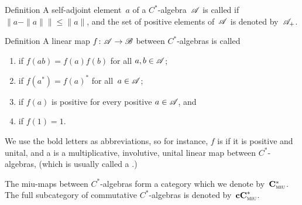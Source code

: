 \documentclass[main]{subfiles}
\begin{document}
\begin{parsec}%
\begin{point}{Definition}%
A self-adjoint element~$a$ of a $C^*$-algebra~$\mathscr{A}$ is called
 if $\|a-\|a\|\|\leq \|a\|$,
and the set of positive elements of~$\mathscr{A}$
is denoted by~$\mathscr{A}_{+}$.
\end{point}
\end{parsec}

\begin{parsec}%
\begin{point}{Definition}
A linear map $f\colon \mathscr{A} \to \mathscr{B}$
between $C^*$-algebras
is called
\begin{enumerate}
\item
{}
if $f(ab)=f(a)f(b)$ for all $a,b\in\mathscr{A}$;
\item
{}
if $f(a^*)=f(a)^*$ for all~$a\in\mathscr{A}$;
\item
{}
if $f(a)$ is positive
for every positive $a\in\mathscr{A}$, and
\item
{}
if $f(1)=1$.
\end{enumerate}
\begin{point}%
We use the bold letters as abbreviations,
so for instance,
$f$ is  if it is positive and unital,
and a 
is a multiplicative, involutive, unital linear map between $C^*$-algebras,
(which is usually called a .)
\end{point}
\begin{point}%
The miu-maps between $C^*$-algebras
form a category which we denote by~$\mathbf{C}^*_{\text{\textsc{miu}}}$.
The full subcategory of commutative $C^*$-algebras
is denoted by~$\mathbf{cC}^*_{\text{\textsc{miu}}}$.
\end{point}
\end{point}
\end{parsec}
\end{document}

